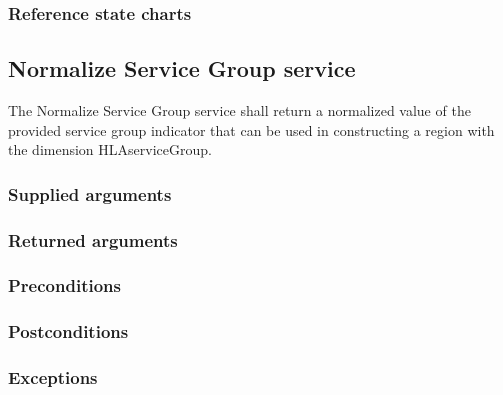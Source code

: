 \begin{compactstdpage}


    \subsubsection{Reference state charts}


    \subsection{Normalize Service Group service}

    The Normalize Service Group service shall return a normalized value of the provided service group indicator that can be used in constructing a region with the dimension HLAserviceGroup.

    \subsubsection{Supplied arguments}


    \subsubsection{Returned arguments}


    \subsubsection{Preconditions}


    \subsubsection{Postconditions}


    \subsubsection{Exceptions}


\end{compactstdpage}

